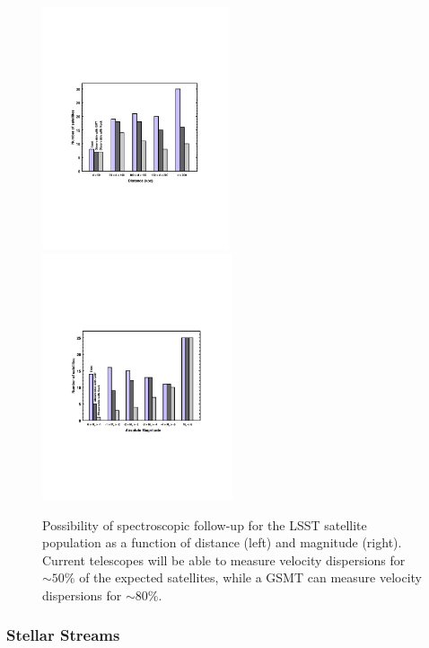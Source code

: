 \begin{figure}
  \centering
  \includegraphics[width=0.49\textwidth]{figures/dwarf_observability_barplot_distance.pdf}
  \includegraphics[width=0.50\textwidth]{figures/dwarf_observability_barplot_luminosity.pdf}
  \caption{Possibility of spectroscopic follow-up for the LSST satellite population as a function of distance (left) and magnitude (right). Current telescopes will be able to measure velocity dispersions for $\sim50\%$ of the expected satellites, while a GSMT can measure velocity dispersions for $\sim80\%$.}
  \label{fig:specfollowup_distance}
\end{figure}

\subsubsection{Stellar Streams }

